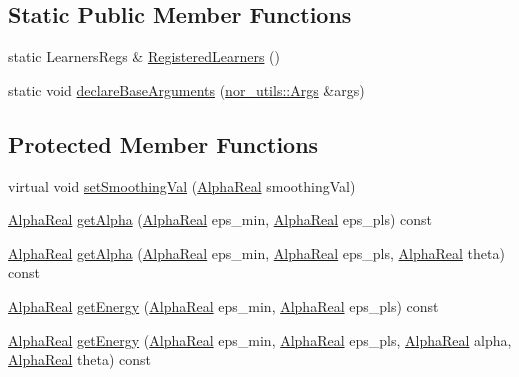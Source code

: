\subsection*{Static Public Member Functions}
\begin{DoxyCompactItemize}
\item 
static LearnersRegs \& \hyperlink{classMultiBoost_1_1BaseLearner_adbe43a0d12b832e87ed1288004031ec4}{RegisteredLearners} ()
\item 
static void \hyperlink{classMultiBoost_1_1BaseLearner_afa55f3a17642588651fb15bf77e744f8}{declareBaseArguments} (\hyperlink{classnor__utils_1_1Args}{nor\_\-utils::Args} \&args)
\end{DoxyCompactItemize}
\subsection*{Protected Member Functions}
\begin{DoxyCompactItemize}
\item 
virtual void \hyperlink{classMultiBoost_1_1BaseLearner_a02657dfe35ffff80d2b2fb44e2d8731c}{setSmoothingVal} (\hyperlink{Defaults_8h_a80184c4fd10ab70a1a17c5f97dcd1563}{AlphaReal} smoothingVal)
\item 
\hyperlink{Defaults_8h_a80184c4fd10ab70a1a17c5f97dcd1563}{AlphaReal} \hyperlink{classMultiBoost_1_1BaseLearner_a45dad309894d70bf723ff75556eaaff1}{getAlpha} (\hyperlink{Defaults_8h_a80184c4fd10ab70a1a17c5f97dcd1563}{AlphaReal} eps\_\-min, \hyperlink{Defaults_8h_a80184c4fd10ab70a1a17c5f97dcd1563}{AlphaReal} eps\_\-pls) const 
\item 
\hyperlink{Defaults_8h_a80184c4fd10ab70a1a17c5f97dcd1563}{AlphaReal} \hyperlink{classMultiBoost_1_1BaseLearner_adfc0dbabc23275cd98efcdcf506b7371}{getAlpha} (\hyperlink{Defaults_8h_a80184c4fd10ab70a1a17c5f97dcd1563}{AlphaReal} eps\_\-min, \hyperlink{Defaults_8h_a80184c4fd10ab70a1a17c5f97dcd1563}{AlphaReal} eps\_\-pls, \hyperlink{Defaults_8h_a80184c4fd10ab70a1a17c5f97dcd1563}{AlphaReal} theta) const 
\item 
\hyperlink{Defaults_8h_a80184c4fd10ab70a1a17c5f97dcd1563}{AlphaReal} \hyperlink{classMultiBoost_1_1BaseLearner_a8d1441eae7f346696848aa158175e27b}{getEnergy} (\hyperlink{Defaults_8h_a80184c4fd10ab70a1a17c5f97dcd1563}{AlphaReal} eps\_\-min, \hyperlink{Defaults_8h_a80184c4fd10ab70a1a17c5f97dcd1563}{AlphaReal} eps\_\-pls) const 
\item 
\hyperlink{Defaults_8h_a80184c4fd10ab70a1a17c5f97dcd1563}{AlphaReal} \hyperlink{classMultiBoost_1_1BaseLearner_a59c8c6a08e003f45a91d813810d0f3d3}{getEnergy} (\hyperlink{Defaults_8h_a80184c4fd10ab70a1a17c5f97dcd1563}{AlphaReal} eps\_\-min, \hyperlink{Defaults_8h_a80184c4fd10ab70a1a17c5f97dcd1563}{AlphaReal} eps\_\-pls, \hyperlink{Defaults_8h_a80184c4fd10ab70a1a17c5f97dcd1563}{AlphaReal} alpha, \hyperlink{Defaults_8h_a80184c4fd10ab70a1a17c5f97dcd1563}{AlphaReal} theta) const 
\end{DoxyCompactItemize}
